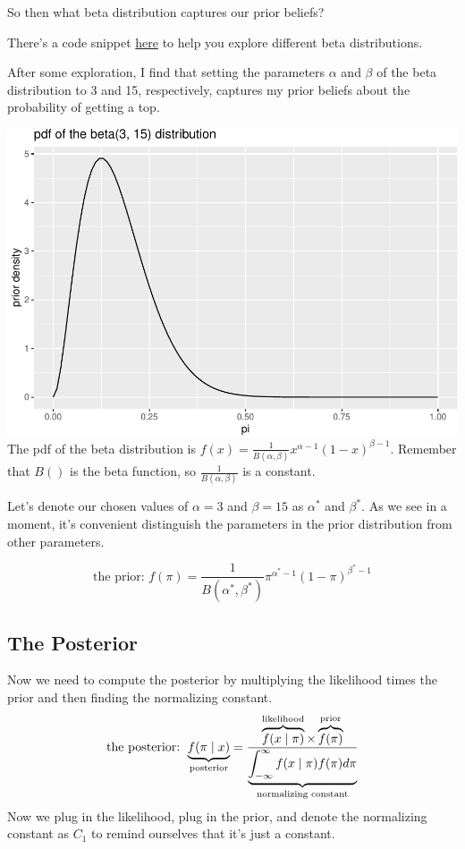 \documentclass[
]{book}
\begin{document}
So then what beta distribution captures our prior beliefs?

There's a code snippet
\href{https://gist.github.com/carlislerainey/45414e0d9f22e4e1960449402e6a8048}{here}
to help you explore different beta distributions.

After some exploration, I find that setting the parameters \(\alpha\)
and \(\beta\) of the beta distribution to 3 and 15, respectively,
captures my prior beliefs about the probability of getting a top.

\includegraphics{02-01-bayes_files/figure-latex/unnamed-chunk-3-1.pdf}
The pdf of the beta distribution is
\(f(x) = \frac{1}{B(\alpha, \beta)} x^{\alpha - 1}(1 - x)^{\beta - 1}\).
Remember that \(B()\) is the beta function, so
\(\frac{1}{B(\alpha, \beta)}\) is a constant.

Let's denote our chosen values of \(\alpha = 3\) and \(\beta = 15\) as
\(\alpha^*\) and \(\beta^*\). As we see in a moment, it's convenient
distinguish the parameters in the prior distribution from other
parameters.

\[
\text{the prior:  }  f(\pi) = \frac{1}{B(\alpha^*, \beta^*)} \pi^{\alpha^* - 1}(1 - \pi)^{\beta^* - 1}
\]

\hypertarget{the-posterior}{%
\subsection{The Posterior}\label{the-posterior}}

Now we need to compute the posterior by multiplying the likelihood times
the prior and then finding the normalizing constant. \[
\text{the posterior: } \displaystyle \underbrace{f(\pi \mid x)}_{\text{posterior}} = \frac{\overbrace{f(x \mid \pi)}^{\text{likelihood}} \times \overbrace{f(\pi)}^{\text{prior}}}{\displaystyle \underbrace{\int_{-\infty}^\infty f(x \mid \pi)f(\pi) d\pi}_{\text{normalizing constant}}} \\
\] Now we plug in the likelihood, plug in the prior, and denote the
normalizing constant as \(C_1\) to remind ourselves that it's just a
constant.
\end{document}

